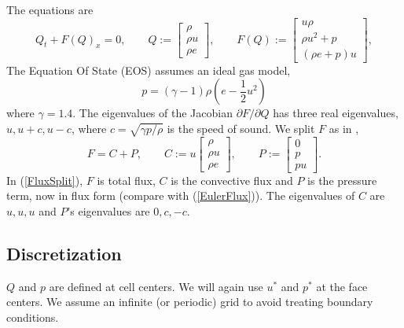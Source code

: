 \documentclass[11pt,oneside]{article}
\def \be {\begin{equation}}
\def \ee {\end{equation}}
\begin{document}
The equations are
\be
Q_t + F(Q)_x = 0,
\qquad
Q :=
\left[
\begin{array}{c}
\rho\\
\rho u\\
\rho e
\end{array}
\right],
\qquad
F(Q) :=
\left[
\begin{array}{c}
u \rho\\
\rho u^2 + p\\
(\rho e + p) u
\end{array}
\right],
\label{ConservativeEulerFlux}
\ee
The Equation Of State (EOS) assumes an ideal gas model,
\be
  p = (\gamma-1) \rho \left( e - \frac12 u^2 \right)
  \label{EOS2}
\ee
where $\gamma=1.4$. The eigenvalues of the Jacobian $\partial F/\partial Q$
has three real eigenvalues, $u, u+c, u-c$, where $c = \sqrt{\gamma p/\rho}$
is the speed of sound. We split $F$ as in \cite[eq.~(7)]{zb},
\be
  F = C + P, \qquad 
  C := 
  u
  \left[
  \begin{array}{c}
  \rho\\
  \rho u\\
  \rho e
  \end{array}
  \right],
  \qquad
  P := 
  \left[
  \begin{array}{c}
  0\\
  p\\
  p u
  \end{array}
  \right].
  \label{FluxSplit}
\ee
In (\ref{FluxSplit}), $F$ is total flux, $C$ is the convective flux and
$P$ is the pressure term, now in flux form (compare with (\ref{EulerFlux})).
The eigenvalues of $C$ are $u,u,u$ and $P$'s eigenvalues are $0,c,-c$.

\subsection{Discretization}
$Q$ and $p$ are defined at cell centers. We will again use $u^*$ and $p^*$ at
the face centers. We assume an infinite (or periodic) grid to avoid treating
boundary conditions.
\end{document}
